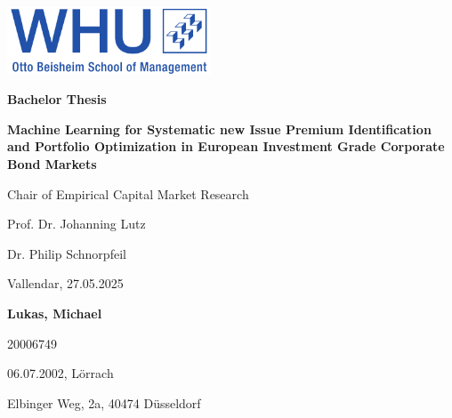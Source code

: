 \begin{titlepage}
    \thispagestyle{empty}
    
    \hfill\includegraphics[height=2cm]{images/logo.pdf}
    
    \vspace{2cm}
    
    \begin{center}
        
        {\Huge \textbf{Bachelor Thesis}}\\
        \vspace{1.5cm}
        
        {\LARGE \textbf{Machine Learning for Systematic new Issue Premium Identification and Portfolio Optimization in European Investment Grade Corporate Bond Markets}}\\
        \vspace{2cm}
        
        {\large Chair of Empirical Capital Market Research}\\
        \vspace{0.5cm}
        
        {\large Prof. Dr. Johanning Lutz}\\
        \vspace{0.2cm}
        
        {\large Dr. Philip Schnorpfeil}\\
        \vspace{2cm}
        
        {\large Vallendar, 27.05.2025}\\
        \vspace{1.5cm}
        
        {\large \textbf{Lukas, Michael}}\\
        \vspace{0.5cm}
        
        {\large 20006749}\\
        \vspace{0.2cm}
        
        {\large 06.07.2002, Lörrach}\\
        \vspace{0.2cm}
        
        {\large Elbinger Weg, 2a, 40474 Düsseldorf}\\
        
    \end{center}
    
\end{titlepage}